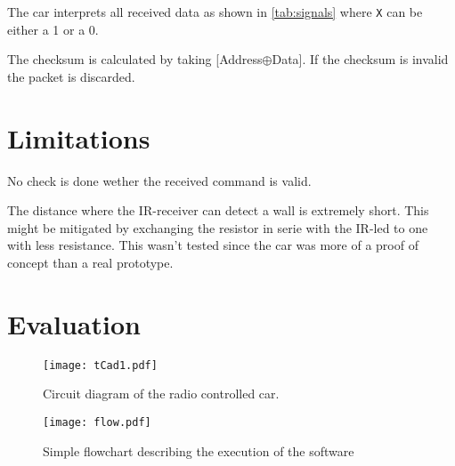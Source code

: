 \documentclass[a4paper,twoside,titlepage]{article}
\begin{document}
The car interprets all received data as shown in \autoref{tab:signals} where {\tt X} can be either a 1 or a 0. 

The checksum is calculated by taking [Address$\oplus$Data]. If the checksum is invalid the packet is discarded.



\section{Limitations} %
\label{sec:limitations}

No check is done wether the received command is valid.

The distance where the IR-receiver can detect a wall is extremely short. This might be mitigated by exchanging the resistor in serie with the IR-led to one with less resistance. This wasn't tested since the car was more of a proof of concept than a real prototype.

\section{Evaluation} %
\label{sec:evaluation}

\clearpage





\begin{figure}[hp]
   \caption{Circuit diagram of the radio controlled car.}
   \label{fig:circuit}
   \vspace{10mm}
   \centering
      \texttt{[image: tCad1.pdf]}
\end{figure}

\begin{figure}[hp]
   \caption{Simple flowchart describing the execution of the software}
   \label{fig:flow}
   \vspace{10mm}
   \centering
      \texttt{[image: flow.pdf]}
\end{figure}

\end{document}
